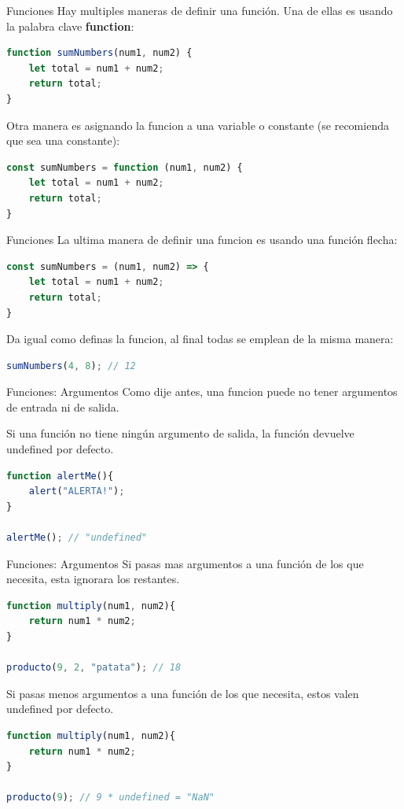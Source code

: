 \documentclass{beamer}
\begin{document}
\begin{frame}[fragile]{Funciones}
Hay multiples maneras de definir una función. Una de ellas es usando la palabra clave \textbf{function}:
\begin{lstlisting}[language=JavaScript]
function sumNumbers(num1, num2) {
    let total = num1 + num2;
    return total;
}\end{lstlisting}
Otra manera es asignando la funcion a una variable o constante (se recomienda que sea una constante):
\begin{lstlisting}[language=JavaScript]
const sumNumbers = function (num1, num2) {
    let total = num1 + num2;
    return total;
}
\end{lstlisting}
\end{frame}

\begin{frame}[fragile]{Funciones}
La ultima manera de definir una funcion es usando una función flecha:
\begin{lstlisting}[language=JavaScript]
const sumNumbers = (num1, num2) => { 
    let total = num1 + num2; 
    return total;
}\end{lstlisting}

Da igual como definas la funcion, al final todas se emplean de la misma manera:
\begin{lstlisting}[language=JavaScript]
sumNumbers(4, 8); // 12
\end{lstlisting}
\end{frame}

\begin{frame}[fragile]{Funciones: Argumentos}
Como dije antes, una funcion puede no tener argumentos de entrada ni de salida.

Si una función no tiene ningún argumento de salida, la función devuelve undefined por defecto.
\begin{lstlisting}[language=JavaScript]
function alertMe(){
    alert("ALERTA!");
}

alertMe(); // "undefined"
\end{lstlisting}
\end{frame}

\begin{frame}[fragile]{Funciones: Argumentos}
Si pasas mas argumentos a una función de los que necesita, esta ignorara los restantes.
\begin{lstlisting}[language=JavaScript]
function multiply(num1, num2){
    return num1 * num2;
}

producto(9, 2, "patata"); // 18
\end{lstlisting}

Si pasas menos argumentos a una función de los que necesita, estos valen undefined por defecto.
\begin{lstlisting}[language=JavaScript]
function multiply(num1, num2){
    return num1 * num2;
}

producto(9); // 9 * undefined = "NaN"
\end{lstlisting}
\end{frame}
\end{document}
